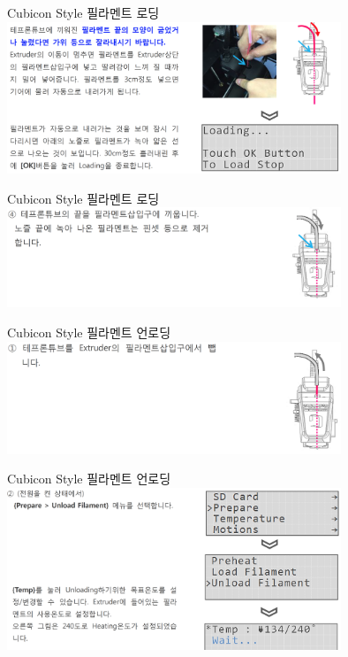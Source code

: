 \documentclass[11pt]{beamer}
\begin{document}
\begin{frame}[t]{Cubicon Style 필라멘트 로딩}\footnotesize
	\centering
	\includegraphics[width=10cm]{./image/18_19.png}
\end{frame}

\begin{frame}[t]{Cubicon Style 필라멘트 로딩}\footnotesize
	\centering
	\includegraphics[width=10cm]{./image/18_20.png}
\end{frame}

\begin{frame}[t]{Cubicon Style 필라멘트 언로딩}\footnotesize
	\centering
	\includegraphics[width=10cm]{./image/18_21.png}
\end{frame}

\begin{frame}[t]{Cubicon Style 필라멘트 언로딩}\footnotesize
	\centering
	\includegraphics[width=10cm]{./image/18_22.png}
\end{frame}
\end{document}
